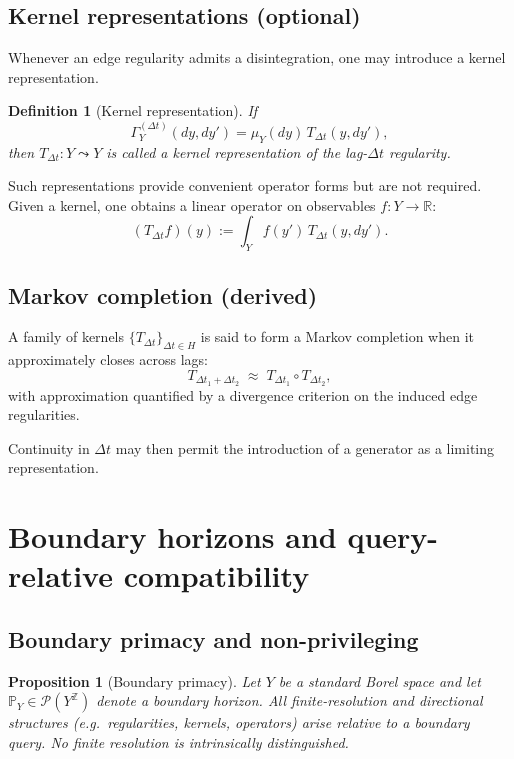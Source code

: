 \documentclass[11pt]{article}
\newtheorem{definition}{Definition}
\newtheorem{proposition}{Proposition}
\begin{document}
\subsection{Kernel representations (optional)}

Whenever an edge regularity admits a disintegration, one may introduce a
kernel representation.

\begin{definition}[Kernel representation]\label{def:kernel-edge}
If
\[
\Gamma_Y^{(\Delta t)}(dy,dy')
=
\mu_Y(dy)\,T_{\Delta t}(y,dy'),
\]
then $T_{\Delta t}:Y\leadsto Y$ is called a kernel representation of the
lag-$\Delta t$ regularity.
\end{definition}

Such representations provide convenient operator forms but are not required.
Given a kernel, one obtains a linear operator on observables $f:Y\to\mathbb R$:
\[
(T_{\Delta t}f)(y)
:=
\int_Y f(y')\,T_{\Delta t}(y,dy').
\]

\subsection{Markov completion (derived)}

A family of kernels $\{T_{\Delta t}\}_{\Delta t\in H}$ is said to form a
Markov completion when it approximately closes across lags:
\[
T_{\Delta t_1+\Delta t_2}
\;\approx\;
T_{\Delta t_1}\circ T_{\Delta t_2},
\]
with approximation quantified by a divergence criterion on the induced
edge regularities.

Continuity in $\Delta t$ may then permit the introduction of a generator as
a limiting representation.


\section{Boundary horizons and query-relative compatibility}

\subsection{Boundary primacy and non-privileging}

\begin{proposition}[Boundary primacy]\label{prop:boundary-primacy}
Let $Y$ be a standard Borel space and let $\mathbb P_Y \in \mathcal P(Y^{\mathbb Z})$
denote a boundary horizon. All finite-resolution and directional structures
(e.g.\ regularities, kernels, operators) arise relative to a boundary query.
No finite resolution is intrinsically distinguished.
\end{proposition}
\end{document}
